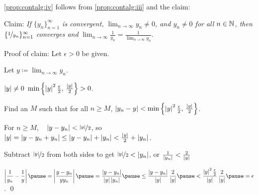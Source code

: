 \documentclass[10pt,aspectratio=169]{beamer}
\begin{document}
\begin{frame}

\eqref{prop:contalg:iv} follows from 
\eqref{prop:contalg:iii} and the claim:

\medskip

Claim: \emph{If $\{ y_n \}_{n=1}^\infty$ is convergent,
$\displaystyle \lim_{n\to\infty} y_n \not= 0$, and $y_n \not= 0$ for all $n \in {\mathbb{N}}$, then
$\{ \nicefrac{1}{y_n} \}_{n=1}^\infty$ converges and}
$\displaystyle \lim_{n\to\infty} \frac{1}{y_n} = \frac{1}{\lim_{n\to\infty} y_n}$.

\pause
\medskip

Proof of claim:  Let $\epsilon > 0$ be given.

\pause
Let $\displaystyle y \coloneqq \lim_{n\to\infty} y_n$.

\pause
$\left\lvert {y} \right\rvert \not= 0$ \wthus $\min \left\{ \left\lvert {y} \right\rvert^2\frac{\epsilon}{2}, \, \frac{\left\lvert {y} \right\rvert}{2} \right\} > 0$.

\pause
Find an $M$ such that for all $n \geq M$,
\quad $\left\lvert {y_n - y} \right\rvert < \min \left\{ \left\lvert {y} \right\rvert^2\frac{\epsilon}{2}, \, \frac{\left\lvert {y} \right\rvert}{2}
\right\}$.

\pause
\medskip

For $n \geq M$, ~
$\left\lvert {y - y_n} \right\rvert < \nicefrac{\left\lvert {y} \right\rvert}{2}$, so
\pause
~~
$\left\lvert {y} \right\rvert = 
\left\lvert {y - y_n + y_n } \right\rvert \leq
\left\lvert {y - y_n} \right\rvert + \left\lvert { y_n } \right\rvert < \frac{\left\lvert {y} \right\rvert}{2} + \left\lvert {y_n} \right\rvert$.

\pause
\medskip

Subtract $\nicefrac{\left\lvert {y} \right\rvert}{2}$ from both sides to get
$\nicefrac{\left\lvert {y} \right\rvert}{2} < \left\lvert {y_n} \right\rvert$, \quad or \quad
$\frac{1}{\left\lvert {y_n} \right\rvert} < \frac{2}{\left\lvert {y} \right\rvert}$

\pause
\medskip
$\displaystyle
\abs{\frac{1}{y_n} - \frac{1}{y}}
\pause
=
\abs{\frac{y - y_n}{y y_n}} 
\pause
=
\frac{\abs{y - y_n}}{\abs{y} \abs{y_n}} 
\pause
\leq
\frac{\abs{y - y_n}}{\abs{y}} \, \frac{2}{\abs{y}} 
\pause
<
\frac{\abs{y}^2 \frac{\epsilon}{2}}{\abs{y}} \, \frac{2}{\abs{y}}
\pause
= \epsilon$.
\qed

\end{frame}
\end{document}
